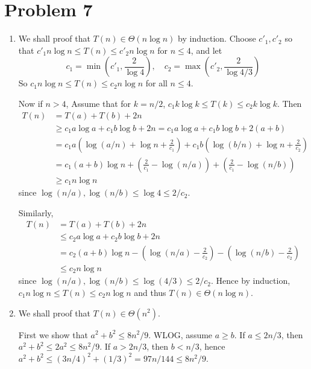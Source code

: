 \documentclass[12pt, a4paper]{article}
\begin{document}
\section{Problem 7}
\begin{enumerate}
  \item We shall proof that $T(n) \in \Theta(n \log n)$ by induction. Choose $c'_1, c'_2$ so that
    $c'_1 n \log n \leq T(n) \leq c'_2 n \log n$ for $n \leq 4$, and let
    \[ c_1 = \min\left(c'_1, \frac{2}{\log 4} \right), \quad c_2 = \max\left(c'_2, \frac{2}{\log 4/3} \right) \]
    So $c_1 n \log n \leq T(n) \leq c_2 n \log n$ for all $n \leq 4$.
    
    Now if $n > 4$, Assume that for $k = n/2$, $c_1 k \log k \leq T(k) \leq c_2 k \log k$. Then
    \begin{align*}
      T(n) &= T(a) + T(b) + 2n  \\
      & \geq c_1 a \log a + c_1 b \log b + 2n = c_1 a \log a + c_1 b \log b + 2(a + b)  \\
      & = c_1 a \left( \log(a/n) + \log n + \frac{2}{c_1} \right) + 
      c_1 b \left( \log(b/n) + \log n + \frac{2}{c_2} \right) \\
      &= c_1 (a + b) \log n + \left(\frac{2}{c_1} - \log(n/a) \right) + \left(\frac{2}{c_1} - \log(n/b) \right) \\
      &\geq c_1 n \log n
    \end{align*}
    since $\log(n/a), \log(n/b) \leq \log 4 \leq 2/c_2$.

    Similarly, 
    \begin{align*}
      T(n) &= T(a) + T(b) + 2n  \\
      & \leq c_2 a \log a + c_2 b \log b + 2n \\
      &= c_2 (a + b) \log n - \left(\log(n/a) - \frac{2}{c_2} \right) - \left(\log(n/b) - \frac{2}{c_2}\right) \\
      &\leq c_2 n \log n
    \end{align*}
    since $\log(n/a), \log(n/b) \leq \log(4/3) \leq 2/c_2$.
    Hence by induction, $c_1 n \log n \leq T(n) \leq c_2 n \log n$ and thus $T(n) \in \Theta(n \log n)$.

  \item We shall proof that $T(n) \in \Theta(n^2)$.

    First we show that $a^2 + b^2 \leq 8 n^2 / 9 $. WLOG, assume $a \geq b$. If $a \leq 2n / 3$, then 
    $a^2 + b^2 \leq 2a^2 \leq 8n^2 / 9$. If $a > 2n / 3$, then $b < n/3$, hence $a^2 + b^2 
    \leq (3n/4)^2 + (1/3)^2 = 97n / 144 \leq 8n^2/9$.


\end{enumerate}
\end{document}
